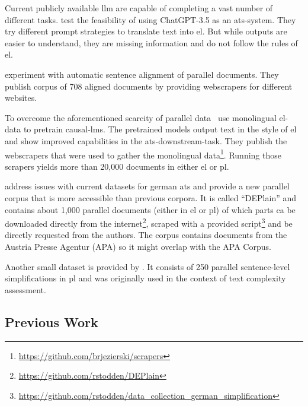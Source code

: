Current publicly available \gls{llm} are capable of completing a vast number of different tasks.
\textcite{deilen2023using} test the feasibility of using ChatGPT-3.5 as an \gls{ats}-system.
They try different prompt strategies to translate text into \gls{el}.
But while outputs are easier to understand, they are missing information and do not follow the rules of \gls{el}.

\textcite{toborek2023new} experiment with automatic sentence alignment of parallel documents.
They publish corpus of 708 aligned documents by providing \gls{webscraper}s for different websites.

To overcome the aforementioned scarcity of parallel data~\textcite{Ansch_tz_2023} use monolingual \gls{el}-data to pretrain \gls{causal-lm}s.
The pretrained models output text in the style of \gls{el} and show improved capabilities in the \gls{ats}-downstream-task.
They publish the \gls{webscraper}s that were used to gather the monolingual data\footnote{\url{https://github.com/brjezierski/scrapers}}.
Running those scrapers yields more than 20,000 documents in either \gls{el} or \gls{pl}.

\textcite{stodden-etal-2023-deplain} address issues with current datasets for german \gls{ats} and provide a new parallel corpus that is more accessible than previous corpora.
It is called \enquote{DEPlain} and contains about 1,000 parallel documents (either in \gls{el} or \gls{pl}) of which parts ca be downloaded directly from the internet\footnote{\url{https://github.com/rstodden/DEPlain}}, scraped with a provided script\footnote{\url{https://github.com/rstodden/data_collection_german_simplification}} and be directly requested from the authors.
The corpus contains documents from the Austria Presse Agentur (APA) so it might overlap with the APA Corpus.

Another small dataset is provided by \textcite{naderi2019subjective}.
It consists of 250 parallel sentence-level simplifications in \gls{pl} and was originally used in the context of text complexity assessment.


\subsection{Previous Work}\label{subsec:previous-work}

